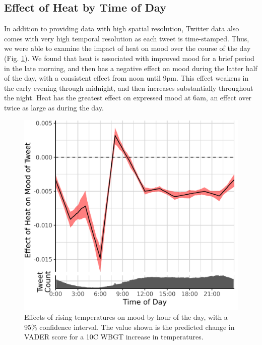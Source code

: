 \documentclass[9pt,twocolumn,twoside,lineno]{pnas-new}
\begin{document}
\subsection*{Effect of Heat by Time of Day}
In addition to providing data with high spatial resolution, Twitter data also comes with very high temporal resolution as each tweet is time-stamped. Thus, we were able to examine the impact of heat on mood over the course of the day (Fig. \ref{fig:ts-wbgt}). We found that heat is associated with improved mood for a brief period in the late morning, and then has a negative effect on mood during the latter half of the day, with a consistent effect from noon until 9pm. This effect weakens in the early evening through midnight, and then increases substantially throughout the night. Heat has the greatest effect on expressed mood at 6am, an effect over twice as large as during the day.

\begin{figure}[H]
 \centering
 \includegraphics[width=0.8\linewidth]{../../res/ts_heat.png}
 \caption{Effects of rising temperatures on mood by hour of the day, with a 95\% confidence interval. The value shown is the predicted change in VADER score for a 10\textdegree C WBGT increase in temperatures.}
 \label{fig:ts-wbgt}
\end{figure}
\end{document}
